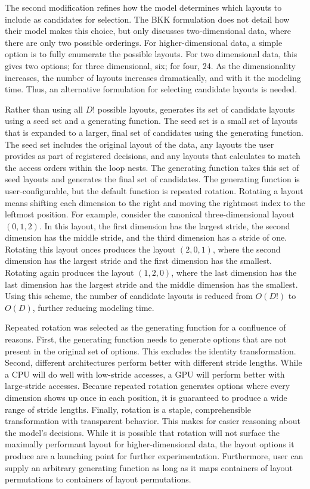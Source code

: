 The second modification refines how the model determines which layouts to include as candidates for selection.
The BKK formulation does not detail how their model makes this choice, but only discusses two-dimensional data, where there are only two possible orderings.
For higher-dimensional data, a simple option is to fully enumerate the possible layouts.
For two dimensional data, this gives two options; for three dimensional, six; for four, 24.
As the dimensionality increases, the number of layouts increases dramatically, and with it the modeling time.
Thus, an alternative formulation for selecting candidate layouts is needed.

Rather than using all $D!$ possible layouts, \FormatDecisions{} generates its set of candidate layouts using a seed set and a generating function.
The seed set is a small set of layouts that is expanded to a larger, final set of candidates using the generating function.
The seed set includes the original layout of the data, any layouts the user provides as part of registered decisions, and any layouts that \FormatDecisions{} calculates to match the access orders within the loop nests.
The generating function takes this set of seed layouts and generates the final set of candidates.
The generating function is user-configurable, but the default function is repeated rotation.
Rotating a layout means shifting each dimension to the right and moving the rightmost index to the leftmost position.
For example, consider the canonical three-dimensional layout $(0,1,2)$. 
In this layout, the first dimension has the largest stride, the second dimension has the middle stride, and the third dimension has a stride of one.
Rotating this layout onces produces the layout $(2,0,1)$, where the second dimension has the largest stride and the first dimension has the smallest.
Rotating again produces the layout $(1,2,0)$, where the last dimension has the last dimension has the largest stride and the middle dimension has the smallest.
Using this scheme, the number of candidate layouts is reduced from $O(D!)$ to $O(D)$, further reducing modeling time.

Repeated rotation was selected as the generating function for a confluence of reasons.
First, the generating function needs to generate options that are not present in the original set of options.
This excludes the identity transformation.
Second, different architectures perform better with different stride lengths.
While a CPU will do well with low-stride accesses, a GPU will perform better with large-stride accesses.
Because repeated rotation generates options where every dimension shows up once in each position, it is guaranteed to produce a wide range of stride lengths.
Finally, rotation is a staple, comprehensible transformation with transparent behavior.
This makes for easier reasoning about the model's decisions.
While it is possible that rotation will not surface the maximally performant layout for higher-dimensional data, the layout options it produce are a launching point for further experimentation.
Furthermore, user can supply an arbitrary generating function as long as it maps containers of layout permutations to containers of layout permutations.


